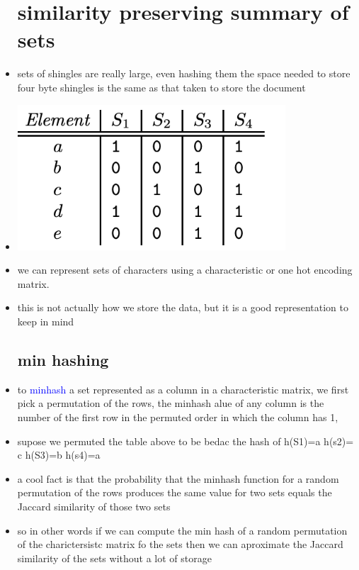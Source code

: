 \documentclass{article}
\begin{document}
\begin{itemize}
\section*{similarity preserving summary of sets}
\item sets of shingles are really large, even hashing them the space needed to store four byte shingles is the same as that taken to store the document 
\item \includegraphics*[width=10cm]{images/Screenshot 2023-05-10 at 10.57.32 PM.png}
\item we can represent sets of characters using a characteristic or one hot encoding matrix. 
\item this is not actually how we store the data, but it is a good representation to keep in mind 
\subsection*{min hashing}
\item to \textcolor{blue}{minhash} a set represented as a column in a characteristic matrix, we first pick a permutation of the rows, the minhash alue of any column is the number of the first row in the permuted order in which the column has 1, 
\item supose we permuted the table above to be bedac the hash of h(S1)=a h(s2)= c h(S3)=b h(s4)=a
\item a cool fact is that the probability that the minhash function for a random permutation of the rows produces the same value for two sets equals the Jaccard similarity of those two sets 
\item so in other words if we can compute the min hash of a random permutation of the charictersistc matrix fo the sets then we can aproximate the Jaccard similarity of the sets without a lot of storage

\end{itemize}
\end{document}
